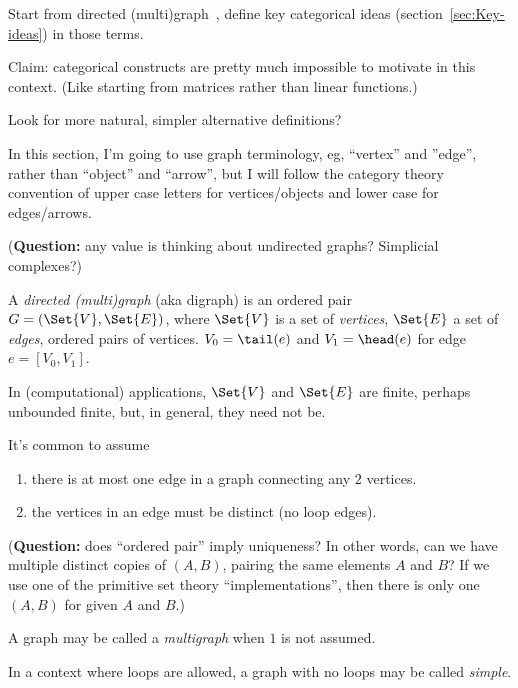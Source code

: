 \documentclass[11pt,openany]{book}
\begin{document}
Start from directed (multi)graph~\cite{wiki_2020_directed_graph},
define key categorical ideas (section~\ref{sec:Key-ideas}) 
in those terms.

Claim: categorical constructs are 
pretty much impossible to motivate in this context.
(Like starting from matrices rather than linear functions.)

Look for more natural, simpler alternative definitions?

In this section, I'm going to use graph terminology,
eg, ``vertex'' and ''edge'', rather than ``object'' and ``arrow'',
but I will follow the category theory convention of
upper case letters for vertices/objects and lower case for
edges/arrows.

\label{sec:Directed_graph}

(\textbf{Question:}
 any value is thinking about undirected graphs?
 Simplicial complexes?)

\begin{definition}
A \textit{directed (multi)graph} (aka digraph) is
an ordered pair $G=\left( \Set{V}, \Set{E} \right)$,
where $\Set{V}$ is a set of \textit{vertices}, 
$\Set{E}$ a set of \textit{edges}, ordered pairs of vertices.
$V_0 = \tail(e)$ and $V_1 = \head(e)$
for edge $e = \left[ V_0, V_1 \right]$.
\end{definition}

In (computational) applications, $\Set{V}$ and $\Set{E}$ 
are finite, perhaps unbounded finite,
but, in general, they need not be.

It's common to assume 
\begin{enumerate}
\item there is at most one edge
in a graph connecting any $2$ vertices.\par
\item the vertices in an edge must be 
distinct (no loop edges).
\end{enumerate}
(\textbf{Question:} does ``ordered pair'' imply uniqueness?
In other words, can we have multiple distinct copies of
 $\left(A,B\right)$, pairing the same elements $A$ and $B$?
 If we use one of the primitive set theory ``implementations'',
 then there is only one $\left(A,B\right)$ 
 for given $A$ and $B$.)

A graph may be called a \textit{multigraph} when $1$ is
not assumed.

In a context where loops are allowed,
a graph with no loops may be called \textit{simple}.
\end{document}
